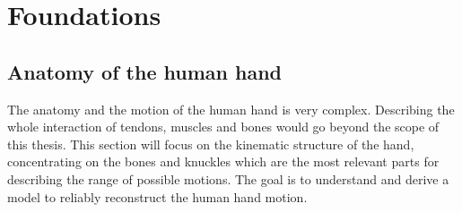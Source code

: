 
\lhead[\chaptername~\thechapter]{\rightmark}

\rhead[\leftmark]{}

\lfoot[\thepage]{}

\cfoot{}

\rfoot[]{\thepage}


\chapter{Foundations}
\label{cha:foundations}

\section{Anatomy of the human hand} \label{sec:anatomy}
The anatomy and the motion of the human hand is very complex. Describing the whole interaction of tendons, muscles and bones would go beyond the scope of this thesis. This section will focus on the kinematic structure of the hand, concentrating on the bones and knuckles which are the most relevant parts for describing the range of possible motions. The goal is to understand and derive a model to reliably reconstruct the human hand motion.\\
